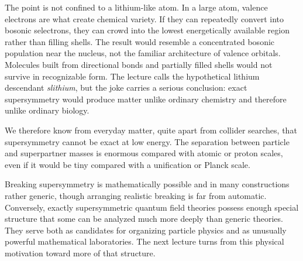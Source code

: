 The point is not confined to a lithium-like atom. In a large atom, valence electrons are what create chemical variety. If they can repeatedly convert into bosonic selectrons, they can crowd into the lowest energetically available region rather than filling shells. The result would resemble a concentrated bosonic population near the nucleus, not the familiar architecture of valence orbitals. Molecules built from directional bonds and partially filled shells would not survive in recognizable form. The lecture calls the hypothetical lithium descendant \emph{slithium}, but the joke carries a serious conclusion: exact supersymmetry would produce matter unlike ordinary chemistry and therefore unlike ordinary biology.

\begin{classroomqa}
\end{classroomqa}

We therefore know from everyday matter, quite apart from collider searches, that supersymmetry cannot be exact at low energy. The separation between particle and superpartner masses is enormous compared with atomic or proton scales, even if it would be tiny compared with a unification or Planck scale.

\begin{classroomqa}
\end{classroomqa}

Breaking supersymmetry is mathematically possible and in many constructions rather generic, though arranging realistic breaking is far from automatic. Conversely, exactly supersymmetric quantum field theories possess enough special structure that some can be analyzed much more deeply than generic theories. They serve both as candidates for organizing particle physics and as unusually powerful mathematical laboratories. The next lecture turns from this physical motivation toward more of that structure.

